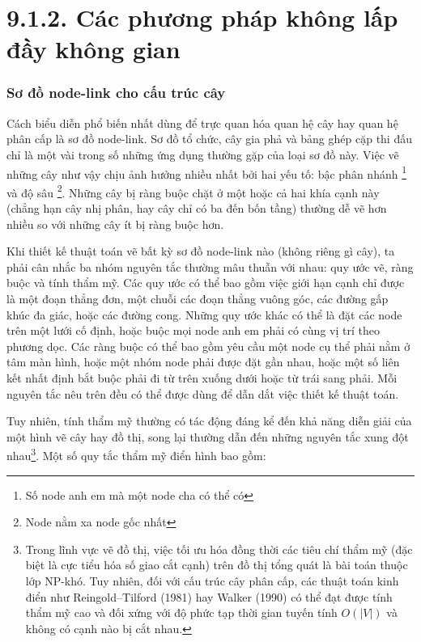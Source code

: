 \documentclass[12pt,a4paper, openany]{book}
\begin{document}
\FloatBarrier
\section*{9.1.2. Các phương pháp không lấp đầy không gian}

\subsubsection{Sơ đồ node-link cho cấu trúc cây}

Cách biểu diễn phổ biến nhất dùng để trực quan hóa quan hệ cây hay quan hệ phân cấp là sơ đồ node-link. Sơ đồ tổ chức, cây gia phả và bảng ghép cặp thi đấu chỉ là một vài trong số những ứng dụng thường gặp của loại sơ đồ này. Việc vẽ những cây như vậy chịu ảnh hưởng nhiều nhất bởi hai yếu tố: bậc phân nhánh \footnote{Số node anh em mà một node cha có thể có} và độ sâu \footnote{Node nằm xa node gốc nhất}. Những cây bị ràng buộc chặt ở một hoặc cả hai khía cạnh này (chẳng hạn cây nhị phân, hay cây chỉ có ba đến bốn tầng) thường dễ vẽ hơn nhiều so với những cây ít bị ràng buộc hơn.

Khi thiết kế thuật toán vẽ bất kỳ sơ đồ node-link nào (không riêng gì cây), ta phải cân nhắc ba nhóm nguyên tắc thường mâu thuẫn với nhau: quy ước vẽ, ràng buộc và tính thẩm mỹ. Các quy ước có thể bao gồm việc giới hạn cạnh chỉ được là một đoạn thẳng đơn, một chuỗi các đoạn thẳng vuông góc, các đường gấp khúc đa giác, hoặc các đường cong. Những quy ước khác có thể là đặt các node trên một lưới cố định, hoặc buộc mọi node anh em phải có cùng vị trí theo phương dọc. Các ràng buộc có thể bao gồm yêu cầu một node cụ thể phải nằm ở tâm màn hình, hoặc một nhóm node phải được đặt gần nhau, hoặc một số liên kết nhất định bắt buộc phải đi từ trên xuống dưới hoặc từ trái sang phải. Mỗi nguyên tắc nêu trên đều có thể được dùng để dẫn dắt việc thiết kế thuật toán.

Tuy nhiên, tính thẩm mỹ thường có tác động đáng kể đến khả năng diễn giải của một hình vẽ cây hay đồ thị, song lại thường dẫn đến những nguyên tắc xung đột nhau\footnote{Trong lĩnh vực vẽ đồ thị, việc tối ưu hóa đồng thời các tiêu chí thẩm mỹ (đặc biệt là cực tiểu hóa số giao cắt cạnh) trên đồ thị tổng quát là bài toán thuộc lớp NP-khó. Tuy nhiên, đối với cấu trúc cây phân cấp, các thuật toán kinh điển như Reingold--Tilford (1981) hay Walker (1990) có thể đạt được tính thẩm mỹ cao và đối xứng với độ phức tạp thời gian tuyến tính $O(|V|)$ và không có cạnh nào bị cắt nhau.}. Một số quy tắc thẩm mỹ điển hình bao gồm:
\end{document}
